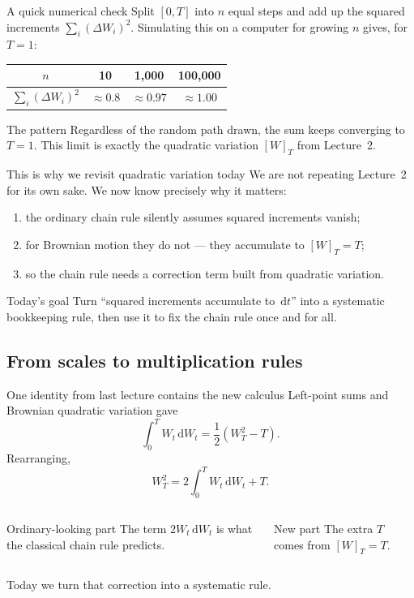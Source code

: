\documentclass[handout,10pt,aspectratio=169]{beamer}
\newcommand{\dd}{\,\mathrm d}
\begin{document}
\begin{frame}{A quick numerical check}
Split \([0,T]\) into \(n\) equal steps and add up the squared increments
\(\sum_i(\Delta W_i)^2\). Simulating this on a computer for growing \(n\)
gives, for \(T=1\):
\begin{center}
\begin{tabular}{cccc}
\toprule
\(n\) & 10 & 1{,}000 & 100{,}000 \\
\midrule
\(\sum_i(\Delta W_i)^2\) & \(\approx0.8\) & \(\approx0.97\) & \(\approx1.00\) \\
\bottomrule
\end{tabular}
\end{center}
\begin{block}{The pattern}
Regardless of the random path drawn, the sum keeps converging to \(T=1\).
This limit is exactly the quadratic variation \([W]_T\) from Lecture~2.
\end{block}
\end{frame}

\begin{frame}{This is why we revisit quadratic variation today}
We are not repeating Lecture~2 for its own sake. We now know precisely why
it matters:
\begin{enumerate}
  \item the ordinary chain rule silently assumes squared increments vanish;
  \item for Brownian motion they do not --- they accumulate to \([W]_T=T\);
  \item so the chain rule needs a correction term built from quadratic
        variation.
\end{enumerate}
\begin{block}{Today's goal}
Turn ``squared increments accumulate to \(\dd t\)'' into a systematic
bookkeeping rule, then use it to fix the chain rule once and for all.
\end{block}
\end{frame}

\subsection{From scales to multiplication rules}

\begin{frame}{One identity from last lecture contains the new calculus}
Left-point sums and Brownian quadratic variation gave
\[
\int_0^T W_t\dd W_t=\frac12(W_T^2-T).
\]
Rearranging,
\[
\boxed{W_T^2=2\int_0^T W_t\dd W_t+T.}
\]
\begin{columns}[T,onlytextwidth]
\begin{block}{Ordinary-looking part}
The term \(2W_t\dd W_t\) is what the classical chain rule predicts.
\end{block}
\begin{block}{New part}
The extra \(T\) comes from \([W]_T=T\).
\end{block}
\end{columns}
Today we turn that correction into a systematic rule.
\end{frame}
\end{document}

